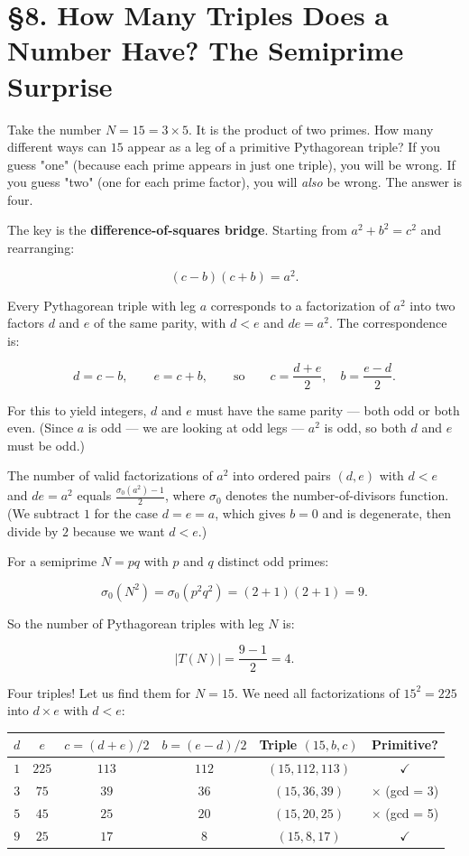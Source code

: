 \documentclass[12pt, letterpaper, openany]{book}
\theoremstyle{definition}
\theoremstyle{remark}
\begin{document}
\section*{§8. How Many Triples Does a Number Have? The Semiprime Surprise}


Take the number $N = 15 = 3 \times 5$. It is the product of two primes. How many different ways can $15$ appear as a leg of a primitive Pythagorean triple? If you guess "one" (because each prime appears in just one triple), you will be wrong. If you guess "two" (one for each prime factor), you will \textit{also} be wrong. The answer is four.

The key is the \textbf{difference-of-squares bridge}. Starting from $a^2 + b^2 = c^2$ and rearranging:

\[
(c - b)(c + b) = a^2.
\]

Every Pythagorean triple with leg $a$ corresponds to a factorization of $a^2$ into two factors $d$ and $e$ of the same parity, with $d < e$ and $de = a^2$. The correspondence is:

\[
d = c - b, \qquad e = c + b, \qquad \text{so} \qquad c = \frac{d + e}{2}, \quad b = \frac{e - d}{2}.
\]

For this to yield integers, $d$ and $e$ must have the same parity --- both odd or both even. (Since $a$ is odd --- we are looking at odd legs --- $a^2$ is odd, so both $d$ and $e$ must be odd.)

The number of valid factorizations of $a^2$ into ordered pairs $(d, e)$ with $d < e$ and $de = a^2$ equals $\frac{\sigma_0(a^2) - 1}{2}$, where $\sigma_0$ denotes the number-of-divisors function. (We subtract $1$ for the case $d = e = a$, which gives $b = 0$ and is degenerate, then divide by $2$ because we want $d < e$.)

For a semiprime $N = pq$ with $p$ and $q$ distinct odd primes:

\[
\sigma_0(N^2) = \sigma_0(p^2 q^2) = (2 + 1)(2 + 1) = 9.
\]

So the number of Pythagorean triples with leg $N$ is:

\[
|T(N)| = \frac{9 - 1}{2} = 4.
\]

Four triples! Let us find them for $N = 15$. We need all factorizations of $15^2 = 225$ into $d \times e$ with $d < e$:


\begin{center}
\begin{tabular}{|c|c|c|c|c|c|}
\hline
$d$ & $e$ & $c = (d+e)/2$ & $b = (e-d)/2$ & Triple $(15, b, c)$ & Primitive? \\
\hline
$1$ & $225$ & $113$ & $112$ & $(15, 112, 113)$ & {$\checkmark$} \\
$3$ & $75$ & $39$ & $36$ & $(15, 36, 39)$ & {$\times$} (gcd = 3) \\
$5$ & $45$ & $25$ & $20$ & $(15, 20, 25)$ & {$\times$} (gcd = 5) \\
$9$ & $25$ & $17$ & $8$ & $(15, 8, 17)$ & {$\checkmark$} \\
\hline
\end{tabular}
\end{center}
\end{document}
